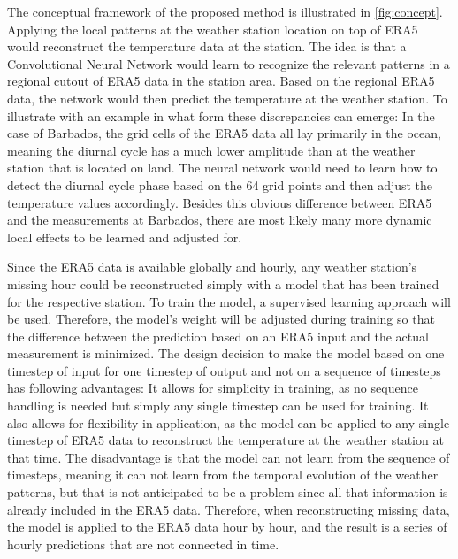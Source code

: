 The conceptual framework of the proposed method is illustrated in \autoref{fig:concept}.
Applying the local patterns at the weather station location on top of ERA5 would reconstruct the temperature data at the station.
The idea is that a Convolutional Neural Network would learn to recognize the relevant patterns in a regional cutout of ERA5 data in the station area.
Based on the regional ERA5 data, the network would then predict the temperature at the weather station.
To illustrate with an example in what form these discrepancies can emerge:
In the case of Barbados, the grid cells of the ERA5 data all lay primarily in the ocean, meaning the diurnal cycle has a much lower amplitude than at the weather station that is located on land. The neural network would need to learn how to detect the diurnal cycle phase based on the 64 grid points and then adjust the temperature values accordingly. Besides this obvious difference between ERA5 and the measurements at Barbados, there are most likely many more dynamic local effects to be learned and adjusted for.

Since the ERA5 data is available globally and hourly, any weather station's missing hour could be reconstructed simply with a model that has been trained for the respective station.
To train the model, a supervised learning approach will be used.
Therefore, the model's weight will be adjusted during training so that the difference between the prediction based on an ERA5 input and the actual measurement is minimized.
The design decision to make the model based on one timestep of input for one timestep of output and not on a sequence of timesteps has following advantages: It allows for simplicity in training, as no sequence handling is needed but simply any single timestep can be used for training.
It also allows for flexibility in application, as the model can be applied to any single timestep of ERA5 data to reconstruct the temperature at the weather station at that time.
The disadvantage is that the model can not learn from the sequence of timesteps, meaning it can not learn from the temporal evolution of the weather patterns, but that is not anticipated to be a problem since all that information is already included in the ERA5 data.
Therefore, when reconstructing missing data, the model is applied to the ERA5 data hour by hour, and the result is a series of hourly predictions that are not connected in time.

